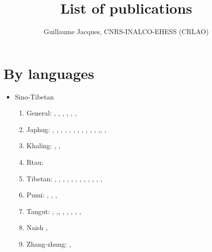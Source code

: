 \documentclass[oldfontcommands,oneside,a4paper,11pt]{article}
\begin{document}
 

  \title{List of publications}
 
\author{Guillaume Jacques, CNRS-INALCO-EHESS (CRLAO)}
\maketitle

 
\section{By languages}
\begin{itemize}
\item Sino-Tibetan
\begin{enumerate}
\item General: \citet{jacques03s.houzhui}, \citet{jacques06morpho}, \citet{jacques07chang}, \citet{antonov12kumush}, \citet{jacques12agreement},    \citet{michaud-jacques12nasalite},     
\item Japhug:  \citet{jacques04redupl},     \citet{jacques04these},   \citet{jacques07passif},  \citet{jacques07redupl}, \citet{jacques08},  \citet{jacques10gesar}, \citet{jacques10refl},  \citet{jacques10inverse},  \citet{jacques12incorp},   \citet{jacques12demotion},  \citet{jacques13harmonization},  \citet{jacques13tropative},\citet{jacques14antipassive}, \citet{japhug14ideophones}, \citet{jacques14inverse}  
\item Khaling: \citet{jacques12khaling},  \citet{jacques13derivational.khaling}, \citet{jacques14auditory}
\item Rtau: \citet{antonov14rtau}
\item Tibetan:  \citet{jacques01dg}, \citet{jacques04thimphu}, \citet{jacques07naksatram},      \citet{jacques08debther},  \citet{jacques09wazur}, \citet{jacques09e},  \citet{jacques10zos},   \citet{jacques10ndr},  \citet{jacques11lingua},  \citet{jacques12internal},  \citet{jacques12transcription}, \citet{jacques13yod}, \citet{jacques14snom}
\item Pumi:  \citet{michaud10bonin}, \citet{jacques11pumi.tone}, \citet{jacques11lingua}, 
\item Tangut: \citet{jacques06comparaison},  \citet{jacques08weiyu},\citet{jacques08alternations},   \citet{jacques09tangutverb},  \citet{jacques10imperial},  \citet{jacques11tangut.verb}, \citet{jacques11ngwemi}, \citet{jacques11kinship},  \citet{jacques14esquisse}
\item Naish \citet{jacques.michaud11naish}, 
\item  Zhang-zhung: \citet{jacques09zz}, 

\end{enumerate}
\end{itemize}
\end{document}
